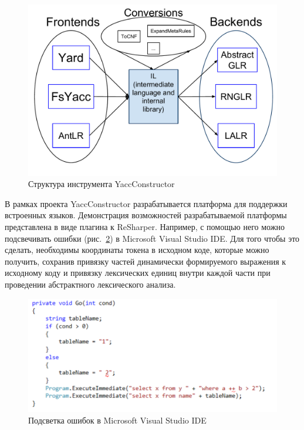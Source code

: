 \begin{itemize}
\begin{figure}[t]
\centering
\includegraphics[width=\textwidth]{Polubelova/YC_base}
\caption{Структура инструмента YaccConstructor}
\label{fig:YC_base} 
\end{figure}


В рамках проекта YaccConstructor разрабатывается платформа для поддержки встроенных языков. Демонстрация возможностей разрабатываемой платформы представлена в виде плагина к ReSharper. Например, с помощью него можно подсвечивать ошибки (рис.~\ref{fig:ReSharper}) в Microsoft Visual Studio IDE. Для того чтобы это сделать, необходимы координаты токена в исходном коде, которые можно получить, сохранив привязку частей динамически формируемого выражения к исходному коду и привязку лексических единиц внутри каждой части при проведении абстрактного лексического анализа.

\begin{figure}[t]
\centering
\includegraphics[width=\textwidth]{Polubelova/ReSharper}
\caption{Подсветка ошибок в Microsoft Visual Studio IDE}
\label{fig:ReSharper} 
\end{figure}
\end{itemize}


